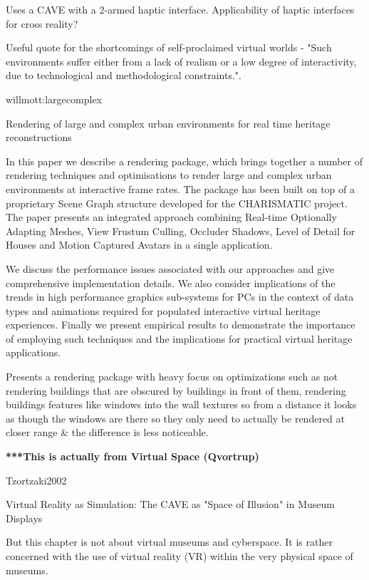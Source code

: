 Uses a CAVE with a 2-armed haptic interface. Applicability of haptic interfaces for cross
reality?
        
Useful quote for the shortcomings of self-proclaimed virtual worlds - "Such environments suffer
either from a lack of realism or a low degree of interactivity, due to technological and
methodological constraints.".


willmott:largecomplex

Rendering of large and complex urban environments for real time heritage reconstructions

In this paper we describe a rendering package, which brings
together a number of rendering techniques and optimisations to
render large and complex urban environments at interactive frame
rates. The package has been built on top of a proprietary Scene
Graph structure developed for the CHARISMATIC project. The
paper presents an integrated approach combining Real-time
Optionally Adapting Meshes, View Frustum Culling, Occluder
Shadows, Level of Detail for Houses and Motion Captured
Avatars in a single application.

We discuss the performance issues associated with our
approaches and give comprehensive implementation details. We
also consider implications of the trends in high performance
graphics sub-systems for PCs in the context of data types and
animations required for populated interactive virtual heritage
experiences. Finally we present empirical results to demonstrate
the importance of employing such techniques and the implications
for practical virtual heritage applications.


Presents a rendering package with heavy focus on optimizations such as not rendering buildings
that are obscured by buildings in front of them, rendering buildings features like windows into
the wall textures so from a distance it looks as though the windows are there so they only need to
actually be rendered at closer range & the difference is less noticeable.


\textbf{***This is actually from Virtual Space (Qvortrup)}

Tzortzaki2002

Virtual Reality as Simulation: The CAVE as "Space of Illusion" in Museum Displays

But this chapter is not about virtual museums and cyberspace. It is rather concerned with the use of virtual reality (VR) within the very physical space of museums.

